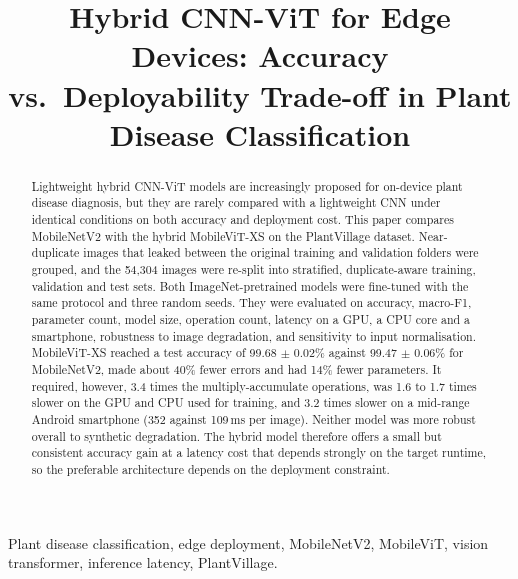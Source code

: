 \documentclass[conference]{IEEEtran}
\begin{document}
%
\title{Hybrid CNN-ViT for Edge Devices: Accuracy vs.\ Deployability Trade-off in Plant Disease Classification}

\author{
}

\maketitle

\begin{abstract}
Lightweight hybrid CNN-ViT models are increasingly proposed for on-device plant disease diagnosis, but they are rarely compared with a lightweight CNN under identical conditions on both accuracy and deployment cost. This paper compares MobileNetV2 with the hybrid MobileViT-XS on the PlantVillage dataset. Near-duplicate images that leaked between the original training and validation folders were grouped, and the 54,304 images were re-split into stratified, duplicate-aware training, validation and test sets. Both ImageNet-pretrained models were fine-tuned with the same protocol and three random seeds. They were evaluated on accuracy, macro-F1, parameter count, model size, operation count, latency on a GPU, a CPU core and a smartphone, robustness to image degradation, and sensitivity to input normalisation. MobileViT-XS reached a test accuracy of 99.68 $\pm$ 0.02\% against 99.47 $\pm$ 0.06\% for MobileNetV2, made about 40\% fewer errors and had 14\% fewer parameters. It required, however, 3.4 times the multiply-accumulate operations, was 1.6 to 1.7 times slower on the GPU and CPU used for training, and 3.2 times slower on a mid-range Android smartphone (352 against 109\,ms per image). Neither model was more robust overall to synthetic degradation. The hybrid model therefore offers a small but consistent accuracy gain at a latency cost that depends strongly on the target runtime, so the preferable architecture depends on the deployment constraint.
\end{abstract}

\begin{IEEEkeywords}
Plant disease classification, edge deployment, MobileNetV2, MobileViT, vision transformer, inference latency, PlantVillage.
\end{IEEEkeywords}
\end{document}
